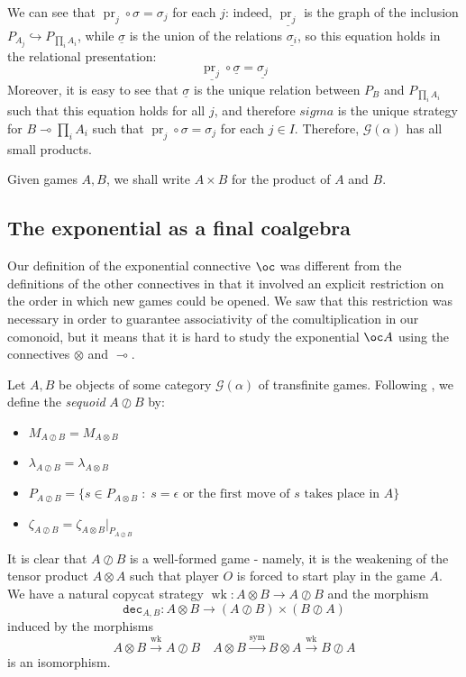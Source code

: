 \documentclass[11pt]{article} %
\theoremstyle{plain} %
\theoremstyle{definition} %
\theoremstyle{note}
\theoremstyle{exercisestyle}
\newcommand*\from{\colon}
\DeclareMathOperator{\pr}{pr}
\newcommand{\tensor}{\otimes}
\newcommand{\sequoid}{\oslash}
\renewcommand{\implies}{\multimap}
\newcommand{\comp}[2]{#1 \circ #2}
\newcommand{\G}{\mathcal G}
\newcommand{\suchthat}{\;\colon\;}
\newcommand{\emptyplay}{\epsilon}
\newcommand{\grel}[1]{\underline{#1}}
\DeclareMathOperator{\sym}{sym}
\newcommand{\braid}{\sym}
\DeclareMathOperator{\wk}{wk}
\newcommand{\dec}{{\texttt{dec}}}
\begin{document}
We can see that $\comp{\pr_j}{\sigma}=\sigma_j$ for each $j$: indeed, $\grel{\pr_j}$ is the graph of the inclusion $P_{A_j}\hookrightarrow P_{\prod_i A_i}$, while $\grel\sigma$ is the union of the relations $\grel{\sigma_i}$, so this equation holds in the relational presentation:
\[
  \comp{\grel{\pr_j}}{\grel{\sigma}}=\grel{\sigma_j}
  \]
Moreover, it is easy to see that $\grel\sigma$ is the unique relation between $P_B$ and $P_{\prod_i A_i}$ such that this equation holds for all $j$, and therefore $sigma$ is the unique strategy for $B\implies\prod_i A_i$ such that $\comp{\pr_j}{\sigma}=\sigma_j$ for each $j\in I$.  Therefore, $\G(\alpha)$ has all small products.  

Given games $A,B$, we shall write $A\times B$ for the product of $A$ and $B$.

\subsection{The exponential as a final coalgebra}

Our definition of the exponential connective $\oc$ was different from the definitions of the other connectives in that it involved an explicit restriction on the order in which new games could be opened.  We saw that this restriction was necessary in order to guarantee associativity of the comultiplication in our comonoid, but it means that it is hard to study the exponential $\oc A$ using the connectives $\tensor$ and $\implies$.  

Let $A,B$ be objects of some category $\G(\alpha)$ of transfinite games.  Following \cite{laird02}, we define the \emph{sequoid} $A\sequoid B$ by:

\begin{itemize}
  \item $M_{A\sequoid B} = M_{A\tensor B}$
  \item $\lambda_{A\sequoid B}=\lambda_{A\tensor B}$
  \item $P_{A\sequoid B} = \{s\in P_{A\tensor B}\suchthat\textrm{$s=\emptyplay$ or the first move of $s$ takes place in $A$}\}$
  \item $\zeta_{A\sequoid B} = \zeta_{A\tensor B}\vert_{P_{A\sequoid B}}$
\end{itemize}

It is clear that $A\sequoid B$ is a well-formed game - namely, it is the weakening of the tensor product $A\tensor A$ such that player $O$ is forced to start play in the game $A$.  We have a natural copycat strategy $\wk\from A\tensor B\to A\sequoid B$ and the morphism
\[
  \dec_{A,B}\from A\tensor B\to (A\sequoid B)\times(B\sequoid A)
  \]
induced by the morphisms
\[
  A\tensor B\xrightarrow{\wk}A\sequoid B\quad A\tensor B\xrightarrow{\braid}B\tensor A\xrightarrow{\wk}B\sequoid A
  \]
is an isomorphism.
\end{document}
